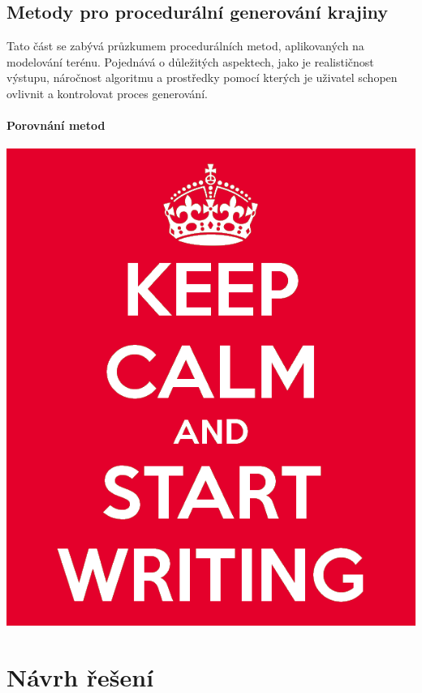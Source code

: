 
\section{Metody pro procedurální generování krajiny}
Tato část se zabývá průzkumem procedurálních metod, aplikovaných na modelování terénu. Pojednává o důležitých aspektech, jako je realističnost výstupu, náročnost algoritmu a prostředky pomocí kterých je uživatel schopen ovlivnit a kontrolovat proces generování.~\cite{inproceedings}

\subsubsection{Porovnání metod}
\includegraphics[scale=0.3]{obrazky-figures/keep-calm.png}

\textcolor{gray}{\blindtext[10]}

\chapter{Návrh řešení}
\label{solution}
\textcolor{gray}{\blindtext[26]}

